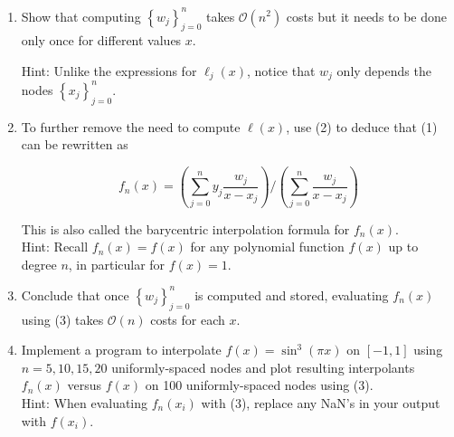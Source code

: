 \documentclass{report}
\begin{document}
{\begin{enumerate}[label=(\alph*)]
\begin{enumerate}[label=(\roman*)]
			            \begin{equation*}
				            f_{n}(x)=\ell(x) \sum_{j=0}^{n} y_{j} \frac{w_{j}}{x-x_{j}}, \text { where } \ell(x)=\prod_{i=0}^{n}\left(x-x_{i}\right) \text { and } w_{j}=\left(\ell^{\prime}\left(x_{j}\right)\right)^{-1}=\left(\prod_{j \neq i=0}^{n}\left(x_{j}-x_{i}\right)\right)^{-1} . \tag{2}
			            \end{equation*}


			      \item Show that computing $\left\{w_{j}\right\}_{j=0}^{n}$ takes $\mathcal{O}\left(n^{2}\right)$ costs but it needs to be done only once for different values $x$.

			            Hint: Unlike the expressions for $\ell_{j}(x)$, notice that $w_{j}$ only depends the nodes $\left\{x_{j}\right\}_{j=0}^{n}$.\\
			      \item To further remove the need to compute $\ell(x)$, use (2) to deduce that (1) can be rewritten as


			            \begin{equation*}
				            f_{n}(x)=\left(\sum_{j=0}^{n} y_{j} \frac{w_{j}}{x-x_{j}}\right) /\left(\sum_{j=0}^{n} \frac{w_{j}}{x-x_{j}}\right) \tag{3}
			            \end{equation*}


			            This is also called the barycentric interpolation formula for $f_{n}(x)$.\\
			            Hint: Recall $f_{n}(x)=f(x)$ for any polynomial function $f(x)$ up to degree $n$, in particular for $f(x)=1$.\\
			      \item Conclude that once $\left\{w_{j}\right\}_{j=0}^{n}$ is computed and stored, evaluating $f_{n}(x)$ using (3) takes $\mathcal{O}(n)$ costs for each $x$.\\
			      \item Implement a program to interpolate $f(x)=\sin ^{3}(\pi x)$ on $[-1,1]$ using $n=5,10,15,20$ uniformly-spaced nodes and plot resulting interpolants $f_{n}(x)$ versus $f(x)$ on 100 uniformly-spaced nodes using (3).\\
			            Hint: When evaluating $f_{n}\left(x_{i}\right)$ with (3), replace any NaN's in your output with $f\left(x_{i}\right)$.

		      \end{enumerate}
	\end{enumerate}
}
\end{document}
